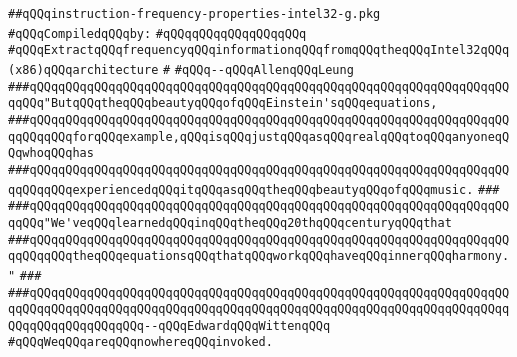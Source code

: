 \label{src/lib/compiler/back/low/intel32/code/instruction-frequency-properties-intel32-g.pkg}
\verb|##qQQqinstruction-frequency-properties-intel32-g.pkg|\newline
\newline
\verb|#qQQqCompiledqQQqby:|\newline
\verb|#qQQqqQQqqQQqqQQqqQQq|\newline
\newline
\newline
\newline
\verb|#qQQqExtractqQQqfrequencyqQQqinformationqQQqfromqQQqtheqQQqIntel32qQQq(x86)qQQqarchitecture|\newline
\verb|#|\newline
\verb|#qQQq--qQQqAllenqQQqLeung|\newline
\newline
\newline
\newline
\verb|###qQQqqQQqqQQqqQQqqQQqqQQqqQQqqQQqqQQqqQQqqQQqqQQqqQQqqQQqqQQqqQQqqQQqqQQq"ButqQQqtheqQQqbeautyqQQqofqQQqEinstein'sqQQqequations,|\newline
\verb|###qQQqqQQqqQQqqQQqqQQqqQQqqQQqqQQqqQQqqQQqqQQqqQQqqQQqqQQqqQQqqQQqqQQqqQQqqQQqforqQQqexample,qQQqisqQQqjustqQQqasqQQqrealqQQqtoqQQqanyoneqQQqwhoqQQqhas|\newline
\verb|###qQQqqQQqqQQqqQQqqQQqqQQqqQQqqQQqqQQqqQQqqQQqqQQqqQQqqQQqqQQqqQQqqQQqqQQqqQQqexperiencedqQQqitqQQqasqQQqtheqQQqbeautyqQQqofqQQqmusic.|\newline
\verb|###|\newline
\verb|###qQQqqQQqqQQqqQQqqQQqqQQqqQQqqQQqqQQqqQQqqQQqqQQqqQQqqQQqqQQqqQQqqQQqqQQq"We'veqQQqlearnedqQQqinqQQqtheqQQq20thqQQqcenturyqQQqthat|\newline
\verb|###qQQqqQQqqQQqqQQqqQQqqQQqqQQqqQQqqQQqqQQqqQQqqQQqqQQqqQQqqQQqqQQqqQQqqQQqqQQqtheqQQqequationsqQQqthatqQQqworkqQQqhaveqQQqinnerqQQqharmony."|\newline
\verb|###|\newline
\verb|###qQQqqQQqqQQqqQQqqQQqqQQqqQQqqQQqqQQqqQQqqQQqqQQqqQQqqQQqqQQqqQQqqQQqqQQqqQQqqQQqqQQqqQQqqQQqqQQqqQQqqQQqqQQqqQQqqQQqqQQqqQQqqQQqqQQqqQQqqQQqqQQqqQQqqQQqqQQq--qQQqEdwardqQQqWittenqQQq|\newline
\newline
\newline
\newline
\verb|#qQQqWeqQQqareqQQqnowhereqQQqinvoked.|\newline
